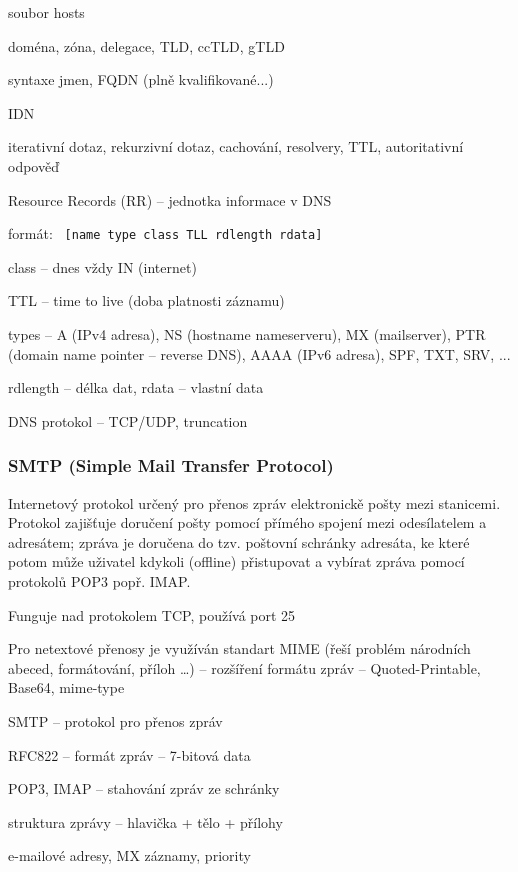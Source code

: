 \begin{pitemize}
	\item soubor hosts
	\item doména, zóna, delegace, TLD, ccTLD, gTLD
	\item syntaxe jmen, FQDN (plně kvalifikované...)
	\item IDN
	\item iterativní dotaz, rekurzivní dotaz, cachování, resolvery, TTL, autoritativní odpověď
	\item Resource Records (RR) -- jednotka informace v DNS
		\begin{pitemize}
			\item formát: \texttt{ [name type class TLL rdlength rdata] }
			\item class -- dnes vždy IN (internet)
			\item TTL -- time to live (doba platnosti záznamu)
			\item types -- A (IPv4 adresa), NS (hostname nameserveru), MX (mailserver), PTR (domain name pointer -- reverse DNS), AAAA (IPv6 adresa), SPF, TXT, SRV, ... 
			\item rdlength -- délka dat, rdata -- vlastní data
		\end{pitemize}
	\item DNS protokol -- TCP/UDP, truncation 
\end{pitemize}

\subsubsection*{SMTP (Simple Mail Transfer Protocol)}
\begin{pitemize}
	\item Internetový protokol určený pro přenos zpráv elektronickě pošty mezi stanicemi. Protokol zajišťuje doručení pošty pomocí přímého spojení mezi odesílatelem a adresátem; zpráva je doručena do tzv. poštovní schránky adresáta, ke které potom může uživatel kdykoli (offline) přistupovat a vybírat zpráva pomocí protokolů POP3 popř. IMAP.
	\item Funguje nad protokolem TCP, používá port 25
	\item Pro netextové přenosy je využíván standart MIME (řeší problém národních abeced, formátování, příloh \dots) -- rozšíření formátu zpráv -- Quoted-Printable, Base64, mime-type
	\item SMTP -- protokol pro přenos zpráv
	\item RFC822 -- formát zpráv -- 7-bitová data
	\item POP3, IMAP -- stahování zpráv ze schránky
	\item struktura zprávy -- hlavička + tělo + přílohy
	\item e-mailové adresy, MX záznamy, priority 
\end{pitemize}

